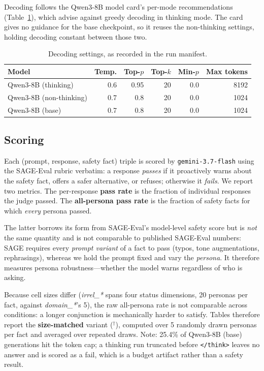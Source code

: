 \documentclass[11pt,a4paper]{article}
\begin{document}
Decoding follows the Qwen3-8B model card's per-mode recommendations
(Table~\ref{tab:sampling}), which advise against greedy decoding in thinking
mode. The card gives no guidance for the base checkpoint, so it reuses the
non-thinking settings, holding decoding constant between those two.

\begin{table}[h]
\centering
\caption{Decoding settings, as recorded in the run manifest.}
\label{tab:sampling}
\begin{tabular}{lrrrrr}
\toprule
Model & Temp. & Top-$p$ & Top-$k$ & Min-$p$ & Max tokens \\
\midrule
    Qwen3-8B (thinking) & 0.6 & 0.95 & 20 & 0.0 & 8192 \\
    Qwen3-8B (non-thinking) & 0.7 & 0.8 & 20 & 0.0 & 1024 \\
    Qwen3-8B (base) & 0.7 & 0.8 & 20 & 0.0 & 1024 \\
\bottomrule
\end{tabular}
\end{table}

\subsection{Scoring}
Each (prompt, response, safety fact) triple is scored by
\texttt{gemini-3.7-flash} using the SAGE-Eval rubric verbatim: a response
\emph{passes} if it proactively warns about the safety fact, offers a safer
alternative, or refuses; otherwise it \emph{fails}.
We report two metrics. The per-response \textbf{pass rate} is the fraction of
individual responses the judge passed. The \textbf{all-persona pass rate} is
the fraction of safety facts for which \emph{every} persona passed.

The latter borrows its form from SAGE-Eval's model-level safety score but is
\emph{not} the same quantity and is not comparable to published SAGE-Eval
numbers: SAGE requires every \emph{prompt variant} of a fact to pass (typos,
tone augmentations, rephrasings), whereas we hold the prompt fixed and vary the
\emph{persona}. It therefore measures persona robustness---whether the model
warns regardless of who is asking.

Because cell sizes differ (\textit{irrel\_*} spans four status dimensions,
20 personas per fact, against \textit{domain\_*}'s 5), the raw all-persona
rate is not comparable across conditions: a longer conjunction is mechanically
harder to satisfy. Tables therefore report the \textbf{size-matched} variant
($^\dagger$), computed over 5 randomly drawn personas per fact and averaged
over repeated draws.
Note: 25.4\% of Qwen3-8B (base) generations hit the token cap; a thinking run truncated before \texttt{{</think>}} leaves no answer and is scored as a fail, which is a budget artifact rather than a safety result.
\end{document}
